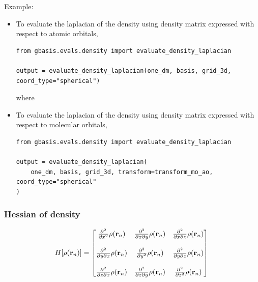 \documentclass[letterpaper]{article}
\begin{document}
Example:
\begin{itemize}
\item To evaluate the laplacian of the density using density matrix expressed
  with respect to atomic orbitals,
  \begin{lstlisting}[xleftmargin=-25pt]
from gbasis.evals.density import evaluate_density_laplacian

output = evaluate_density_laplacian(one_dm, basis, grid_3d, coord_type="spherical")
\end{lstlisting}
  where
\item To evaluate the laplacian of the density using density matrix expressed
  with respect to molecular orbitals,
  \begin{lstlisting}[xleftmargin=-25pt]
from gbasis.evals.density import evaluate_density_laplacian

output = evaluate_density_laplacian(
    one_dm, basis, grid_3d, transform=transform_mo_ao, coord_type="spherical"
)
\end{lstlisting}
\end{itemize}
\subsubsection{Hessian of density}
\begin{equation}
	H[\rho(\mathbf{r}_n)]
	=
	\begin{bmatrix}
		\frac{\partial^2}{\partial x^2} \rho(\mathbf{r}_n) &
		\frac{\partial^2}{\partial x \partial y} \rho(\mathbf{r}_n) &
		\frac{\partial^2}{\partial x \partial z} \rho(\mathbf{r}_n)\\\\
		\frac{\partial^2}{\partial y \partial x} \rho(\mathbf{r}_n) &
		\frac{\partial^2}{\partial y^2} \rho(\mathbf{r}_n)&
		\frac{\partial^2}{\partial y \partial z} \rho(\mathbf{r}_n)\\\\
		\frac{\partial^2}{\partial z \partial x} \rho(\mathbf{r}_n) &
		\frac{\partial^2}{\partial z \partial y} \rho(\mathbf{r}_n)&
		\frac{\partial^2}{\partial z^2} \rho(\mathbf{r}_n)\\
	\end{bmatrix}\\
\end{equation}
\end{document}
